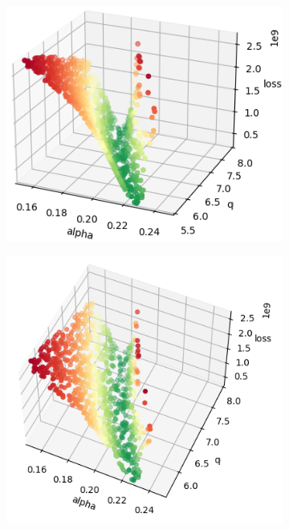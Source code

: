 \begin{figure}
\begin{subfigure}[b]{0.4\textwidth}
	\end{subfigure}
	\begin{subfigure}[b]{0.4\textwidth}
		\centering
		\includegraphics[width=\textwidth]{./figures/sensitivity/sensitivity_zoom2_0_2.png}	
	\end{subfigure}
	\begin{subfigure}[b]{0.4\textwidth}
		\centering
		\includegraphics[width=\textwidth]{./figures/sensitivity/sensitivity_zoom2_1_2.png}	

\end{subfigure}
\end{figure}
